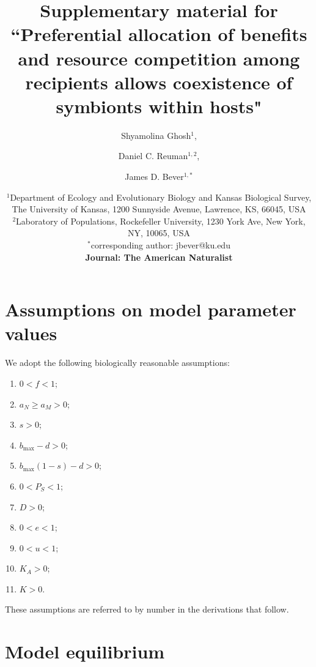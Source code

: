 \documentclass[letterpaper,11pt]{article}
\title{Supplementary material for ``Preferential allocation of benefits and resource competition among recipients allows coexistence of symbionts within hosts"}
\author{Shyamolina Ghosh$^1$, \and Daniel C. Reuman$^{1,2}$, \and James D. Bever$^{1,*}$}
\date{%
    $^1$Department of Ecology and Evolutionary Biology and Kansas Biological Survey, The University of Kansas, 1200 Sunnyside Avenue, Lawrence, KS, 66045, USA\\%
    $^2$Laboratory of Populations, Rockefeller University, 1230 York Ave, New York, NY, 10065, USA\\[2ex]%
    $^*$corresponding author: jbever@ku.edu \\\vspace{1 cm}   
    \textbf{Journal: The American Naturalist}   
}
\newcommand{\bmax}{b_{\text{max}}}
\begin{document}
\maketitle

\section{Assumptions on model parameter values}\label{sect:assumptions}

\noindent We adopt the following biologically reasonable assumptions:
\begin{enumerate}
\item $0<f<1$;
\item $a_N \geq a_M > 0$;
\item $s>0$;
\item $\bmax-d>0$;
\item $\bmax(1-s)-d>0$;
\item $0<P_S<1$;
\item $D>0$;
\item $0<e<1$;
\item $0<u<1$;
\item $K_A>0$;
\item $K>0$.
\end{enumerate}
These assumptions are referred to by number in the derivations that follow.

\section{Model equilibrium}\label{sect:equil}
\end{document}
